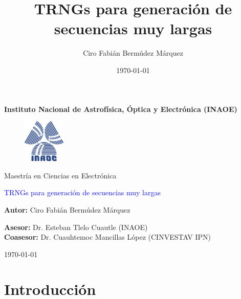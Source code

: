 \documentclass[10pt]{beamer}
\author{Ciro Fabián Bermúdez Márquez}
\title{TRNGs para generación de secuencias muy largas}
\institute{Instituto Nacional de Astrofísica, Óptica y Electrónica}
\date{\today}
\begin{document}
\begin{frame}[plain]
    \selectfont
	\begin{center}
		\textbf{Instituto Nacional de Astrofísica, Óptica y Electrónica (INAOE)}
	\end{center}
	
	\begin{figure}[hbtp]
		\centering
		\includegraphics[width = 2cm]{Inaoe} 
	\end{figure}
	
	\begin{center}
		Maestría en Ciencias en Electrónica
	\end{center}
					
	\begin{center}
		\begin{Large}
		\textcolor{blue}{TRNGs para generación de secuencias muy largas}
		\end{Large}
	\end{center}
	
	\begin{center}
		\textbf{Autor:} Ciro Fabián Bermúdez Márquez
	\end{center}
	
	\begin{flushleft}
		\textbf{Asesor:} Dr. Esteban Tlelo Cuautle (INAOE)\\
	    \textbf{Coasesor:} Dr. Cuauhtemoc Mancillas López (CINVESTAV IPN)
	\end{flushleft}
	
	\begin{flushright}
	    \today
	\end{flushright}
\end{frame}

\begin{frame}
    \tableofcontents
\end{frame}

\section{Introducción}
\end{document}
